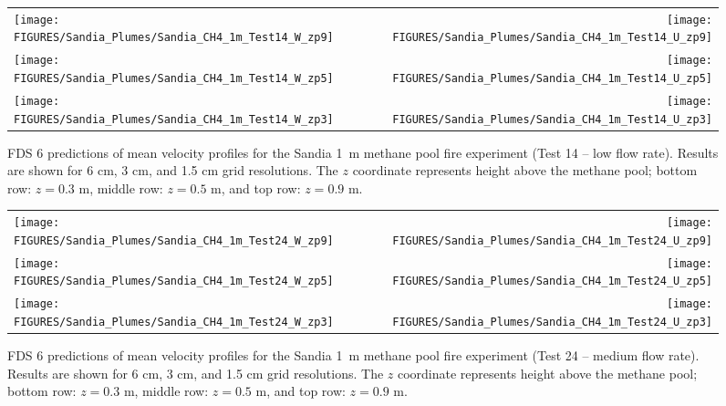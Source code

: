 \begin{figure}[p]
\begin{tabular*}{\textwidth}{l@{\extracolsep{\fill}}r}
\texttt{[image: FIGURES/Sandia\_Plumes/Sandia\_CH4\_1m\_Test14\_W\_zp9]} &
\texttt{[image: FIGURES/Sandia\_Plumes/Sandia\_CH4\_1m\_Test14\_U\_zp9]} \\
\texttt{[image: FIGURES/Sandia\_Plumes/Sandia\_CH4\_1m\_Test14\_W\_zp5]} &
\texttt{[image: FIGURES/Sandia\_Plumes/Sandia\_CH4\_1m\_Test14\_U\_zp5]} \\
\texttt{[image: FIGURES/Sandia\_Plumes/Sandia\_CH4\_1m\_Test14\_W\_zp3]} &
\texttt{[image: FIGURES/Sandia\_Plumes/Sandia\_CH4\_1m\_Test14\_U\_zp3]}
\end{tabular*}
\caption[Sandia 1~m methane pool fire (Test 14) mean velocity profiles.]
{FDS 6 predictions of mean velocity profiles for the Sandia 1~m methane pool fire experiment (Test 14 -- low flow rate). Results are shown for 6 cm, 3 cm, and 1.5 cm grid resolutions. The $z$ coordinate represents height above the methane pool; bottom row: $z=0.3$ m, middle row: $z=0.5$ m, and top row: $z=0.9$ m.}
\label{Sandia_CH4_1m_Test14_velocity}
\end{figure}

\begin{figure}[p]
\begin{tabular*}{\textwidth}{l@{\extracolsep{\fill}}r}
\texttt{[image: FIGURES/Sandia\_Plumes/Sandia\_CH4\_1m\_Test24\_W\_zp9]} &
\texttt{[image: FIGURES/Sandia\_Plumes/Sandia\_CH4\_1m\_Test24\_U\_zp9]} \\
\texttt{[image: FIGURES/Sandia\_Plumes/Sandia\_CH4\_1m\_Test24\_W\_zp5]} &
\texttt{[image: FIGURES/Sandia\_Plumes/Sandia\_CH4\_1m\_Test24\_U\_zp5]} \\
\texttt{[image: FIGURES/Sandia\_Plumes/Sandia\_CH4\_1m\_Test24\_W\_zp3]} &
\texttt{[image: FIGURES/Sandia\_Plumes/Sandia\_CH4\_1m\_Test24\_U\_zp3]}
\end{tabular*}
\caption[Sandia 1~m methane pool fire (Test 24) mean velocity profiles.]
{FDS 6 predictions of mean velocity profiles for the Sandia 1~m methane pool fire experiment (Test 24 -- medium flow rate). Results are shown for 6 cm, 3 cm, and 1.5 cm grid resolutions. The $z$ coordinate represents height above the methane pool; bottom row: $z=0.3$ m, middle row: $z=0.5$ m, and top row: $z=0.9$ m.}
\label{Sandia_CH4_1m_Test24_velocity}
\end{figure}

